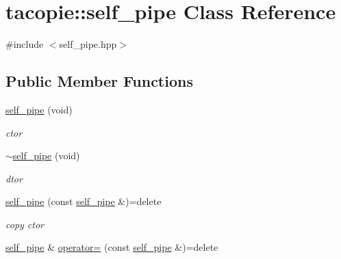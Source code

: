 \hypertarget{classtacopie_1_1self__pipe}{}\section{tacopie\+:\+:self\+\_\+pipe Class Reference}
\label{classtacopie_1_1self__pipe}


{\ttfamily \#include $<$self\+\_\+pipe.\+hpp$>$}

\subsection*{Public Member Functions}
\begin{DoxyCompactItemize}
\item 
\mbox{\label{classtacopie_1_1self__pipe_add8d2c43863d1505e6851789ab5d9b97}} 
\hyperlink{classtacopie_1_1self__pipe_add8d2c43863d1505e6851789ab5d9b97}{self\+\_\+pipe} (void)
\begin{DoxyCompactList}\small\item\em ctor \end{DoxyCompactList}\item 
\mbox{\label{classtacopie_1_1self__pipe_a10a6c4b0d67a4a14abea397a05cee54c}} 
\hyperlink{classtacopie_1_1self__pipe_a10a6c4b0d67a4a14abea397a05cee54c}{$\sim$self\+\_\+pipe} (void)
\begin{DoxyCompactList}\small\item\em dtor \end{DoxyCompactList}\item 
\mbox{\label{classtacopie_1_1self__pipe_a09ffc77b89ad48bc8db6635108c68b6b}} 
\hyperlink{classtacopie_1_1self__pipe_a09ffc77b89ad48bc8db6635108c68b6b}{self\+\_\+pipe} (const \hyperlink{classtacopie_1_1self__pipe}{self\+\_\+pipe} \&)=delete
\begin{DoxyCompactList}\small\item\em copy ctor \end{DoxyCompactList}\item 
\mbox{\label{classtacopie_1_1self__pipe_a14e0fa3a880b6c9559c087eac480c518}} 
\hyperlink{classtacopie_1_1self__pipe}{self\+\_\+pipe} \& \hyperlink{classtacopie_1_1self__pipe_a14e0fa3a880b6c9559c087eac480c518}{operator=} (const \hyperlink{classtacopie_1_1self__pipe}{self\+\_\+pipe} \&)=delete

\end{DoxyCompactItemize}
